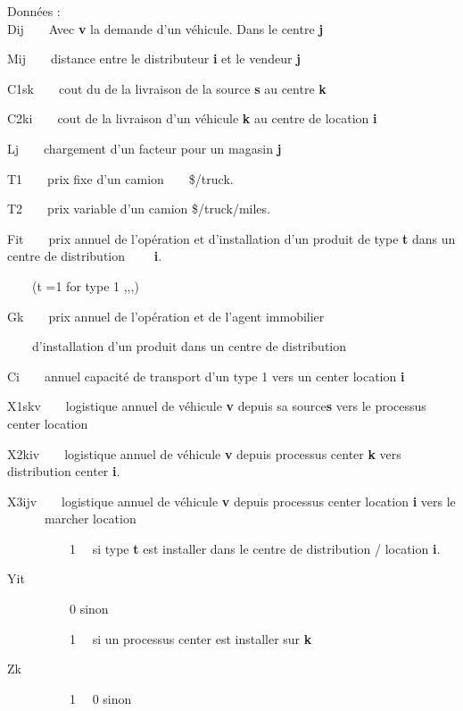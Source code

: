 \documentclass{ceri}
\begin{document}
Donn\'ees :\\


Dij\ \ \ \ Avec \textbf{v} la demande d'un v\'ehicule. Dans le centre \textbf{j}

Mij\ \ \ \ distance entre le distributeur \textbf{i} et le vendeur \textbf{j}

C1sk\ \ \ \ cout du de la livraison de la source \textbf{s} au centre \textbf{k}

C2ki\ \ \ \ cout de la livraison d'un v\'ehicule \textbf{k} au centre de location \textbf{i}

Lj\ \ \ \ chargement d'un facteur pour un magasin \textbf{j}

T1\ \ \ \ prix fixe d'un camion\ \ \ \ \$/truck.

T2\ \ \ \ prix variable d'un camion \$/truck/miles.

Fit\ \ \ \ prix annuel de l'op\'eration et d'installation d'un produit de type \textbf{t} dans un centre de  distribution \ \ \ \ \textbf{i}.

\ \ \ \ (t =1 for type 1 ,,,)

Gk\ \ \ \ prix annuel de l'op\'eration et de l'agent immobilier

\ \ \ \ d'installation d'un produit dans un centre de distribution

Ci\ \ \ \ annuel capacit\'e de transport d'un type 1 vers un center location \textbf{i}

X1skv\ \ \ \ logistique annuel de v\'ehicule \textbf{v }depuis sa source\textbf{s} vers le processus center location 

X2kiv\ \ \ \ logistique annuel de v\'ehicule \textbf{v }depuis processus center \textbf{k} vers distribution center \textbf{i}.

X3ijv\ \ \ \ logistique annuel de v\'ehicule \textbf{v }depuis processus center location \textbf{i} vers le \ \ \ \ \ \ marcher location

\bigskip

\ \ \ \ \ \ {\textbar}\ \ \ \ 1 \ \ si type \textbf{t} est installer dans le centre de distribution / location \textbf{i}.

Yit

\ \ \ \ \ \ {\textbar}\ \ \ \ 0 sinon

\bigskip

\ \ \ \ \ \ {\textbar}\ \ \ \ 1 \ \ si un processus center est installer sur \textbf{k}

Zk\ \ 

\ \ \ \ \ \ {\textbar}\ \ \ \ 1 \ \ 0 sinon
\end{document}
